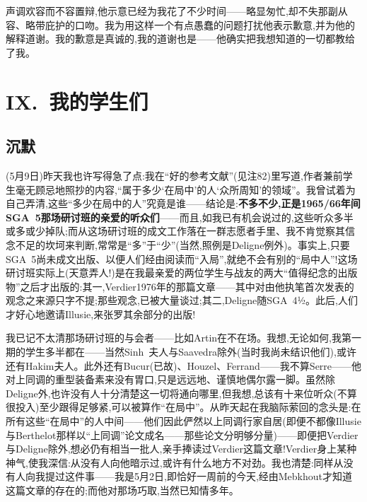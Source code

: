 声调欢容而不容置辩,他示意已经为我花了不少时间——略显匆忙,却不失那副从容、略带庇护的口吻。我为用这样一个有点愚蠢的问题打扰他表示歉意,并为他的解释道谢。我的歉意是真诚的,我的道谢也是——他确实把我想知道的一切都教给了我。

\section{IX.~我的学生们}

\subsection{沉默}


\dmark{}(5月9日)昨天我也许写得急了点:我在“好的参考文献”(见注82)里写道,作者兼前学生毫无顾忌地照抄的内容,“属于多少‘在局中’的人‘众所周知’的领域”。我曾试着为自己弄清,这些“多少在局中的人”究竟是谁——结论是:\textbf{不多不少,正是1965/66年间SGA~5那场研讨班的亲爱的听众们}——而且,如我已有机会说过的,这些听众多半或多或少掉队;而从这场研讨班的成文工作落在一群志愿者手里、我不肯觉察其信念不足的坎坷来判断,常常是“多”于“少”(当然,照例是Deligne例外)。事实上,只要SGA~5尚未成文出版、以便人们经由阅读而“入局”,就绝不会有别的“局中人”!这场研讨班实际上(天意弄人!)是在我最亲爱的两位学生与战友的两大“值得纪念的出版物”之后才出版的:其一,Verdier1976年的那篇文章——其中对由他执笔首次发表的观念之来源只字不提;那些观念,已被大量谈过;其二,Deligne随SGA~4½。此后,人们才好心地邀请Illusie,来张罗其余部分的出版!

我已记不太清那场研讨班的与会者——比如Artin在不在场。我想,无论如何,我第一期的学生多半都在——当然Sinh~夫人与Saavedra除外(当时我尚未结识他们),或许还有Hakim夫人。此外还有Bucur(已故)、Houzel、Ferrand——我不算Serre——他对上同调的重型装备素来没有胃口,只是远远地、谨慎地偶尔露一脚。虽然除Deligne外,也许没有人十分清楚这一切将通向哪里,但我想,总该有十来位听众(不算很投入)至少跟得足够紧,可以被算作“在局中”\dmark{}。从昨天起在我脑际萦回的念头是:在所有这些“在局中”的人中间——他们因此俨然以上同调行家自居(即便不都像Illusie与Berthelot那样以“上同调”论文成名——那些论文分明够分量)——即便把Verdier与Deligne除外,想必仍有相当一批人,亲手捧读过Verdier这篇文章!Verdier身上某种神气,使我深信:从没有人向他暗示过,或许有什么地方不对劲。我也清楚:同样从没有人向我提过这件事——我是5月2日,即恰好一周前的今天,经由Mebkhout才知道这篇文章的存在的;而他对那场巧取,当然已知情多年。

